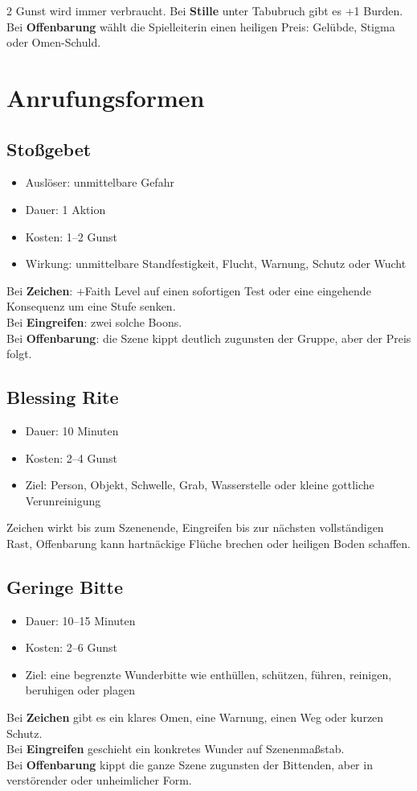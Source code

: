 \begin{multicols*}{2}
Gunst wird immer verbraucht. Bei \textbf{Stille} unter Tabubruch gibt es +1 Burden. Bei \textbf{Offenbarung} wählt die Spielleiterin einen heiligen Preis: Gelübde, Stigma oder Omen-Schuld.

\section{Anrufungsformen}
\subsection{Stoßgebet}
\begin{itemize}[leftmargin=*]
\item Auslöser: unmittelbare Gefahr
\item Dauer: 1 Aktion
\item Kosten: 1--2 Gunst
\item Wirkung: unmittelbare Standfestigkeit, Flucht, Warnung, Schutz oder Wucht
\end{itemize}
Bei \textbf{Zeichen}: +Faith Level auf einen sofortigen Test oder eine eingehende Konsequenz um eine Stufe senken.\\
Bei \textbf{Eingreifen}: zwei solche Boons.\\
Bei \textbf{Offenbarung}: die Szene kippt deutlich zugunsten der Gruppe, aber der Preis folgt.

\subsection{Blessing Rite}
\begin{itemize}[leftmargin=*]
\item Dauer: 10 Minuten
\item Kosten: 2--4 Gunst
\item Ziel: Person, Objekt, Schwelle, Grab, Wasserstelle oder kleine gottliche Verunreinigung
\end{itemize}
Zeichen wirkt bis zum Szenenende, Eingreifen bis zur nächsten vollständigen Rast, Offenbarung kann hartnäckige Flüche brechen oder heiligen Boden schaffen.

\subsection{Geringe Bitte}
\begin{itemize}[leftmargin=*]
\item Dauer: 10--15 Minuten
\item Kosten: 2--6 Gunst
\item Ziel: eine begrenzte Wunderbitte wie enthüllen, schützen, führen, reinigen, beruhigen oder plagen
\end{itemize}
Bei \textbf{Zeichen} gibt es ein klares Omen, eine Warnung, einen Weg oder kurzen Schutz.\\
Bei \textbf{Eingreifen} geschieht ein konkretes Wunder auf Szenenmaßstab.\\
Bei \textbf{Offenbarung} kippt die ganze Szene zugunsten der Bittenden, aber in verstörender oder unheimlicher Form.


\end{multicols*}
